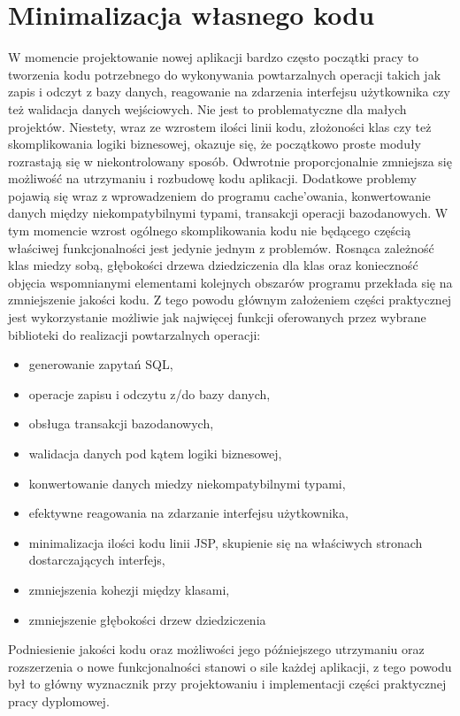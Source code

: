 	\section{Minimalizacja własnego kodu}
		W momencie projektowanie nowej aplikacji bardzo często początki pracy to tworzenia kodu potrzebnego do wykonywania powtarzalnych operacji takich jak zapis i odczyt z bazy danych, reagowanie na zdarzenia interfejsu użytkownika czy też walidacja danych wejściowych. Nie jest to problematyczne dla małych projektów. Niestety, wraz ze wzrostem ilości linii kodu, złożoności klas czy też skomplikowania logiki biznesowej, okazuje się, że początkowo proste moduły rozrastają się w niekontrolowany sposób. Odwrotnie proporcjonalnie zmniejsza się możliwość na utrzymaniu i rozbudowę kodu aplikacji. Dodatkowe problemy pojawią się wraz z wprowadzeniem do programu cache'owania, konwertowanie danych między niekompatybilnymi typami, transakcji operacji bazodanowych. W tym momencie wzrost ogólnego skomplikowania kodu nie będącego częścią właściwej funkcjonalności jest jedynie jednym z problemów. Rosnąca zależność klas miedzy sobą, głębokości drzewa dziedziczenia dla klas oraz konieczność objęcia wspomnianymi elementami kolejnych obszarów programu przekłada się na zmniejszenie jakości kodu. Z tego powodu głównym założeniem części praktycznej jest wykorzystanie możliwie jak najwięcej funkcji oferowanych przez wybrane biblioteki do realizacji powtarzalnych operacji:
		\begin{itemize}
			\item generowanie zapytań SQL,
			\item operacje zapisu i odczytu z/do bazy danych,
			\item obsługa transakcji bazodanowych,
			\item walidacja danych pod kątem logiki biznesowej,
			\item konwertowanie danych miedzy niekompatybilnymi typami,
			\item efektywne reagowania na zdarzanie interfejsu użytkownika,
			\item minimalizacja ilości kodu linii JSP, skupienie się na właściwych stronach dostarczających interfejs,
			\item zmniejszenia kohezji między klasami,
			\item zmniejszenie głębokości drzew dziedziczenia
		\end{itemize}
		Podniesienie jakości kodu oraz możliwości jego późniejszego utrzymaniu oraz rozszerzenia o nowe funkcjonalności stanowi o sile każdej aplikacji, z tego powodu był to główny wyznacznik przy projektowaniu i implementacji części praktycznej pracy dyplomowej.
